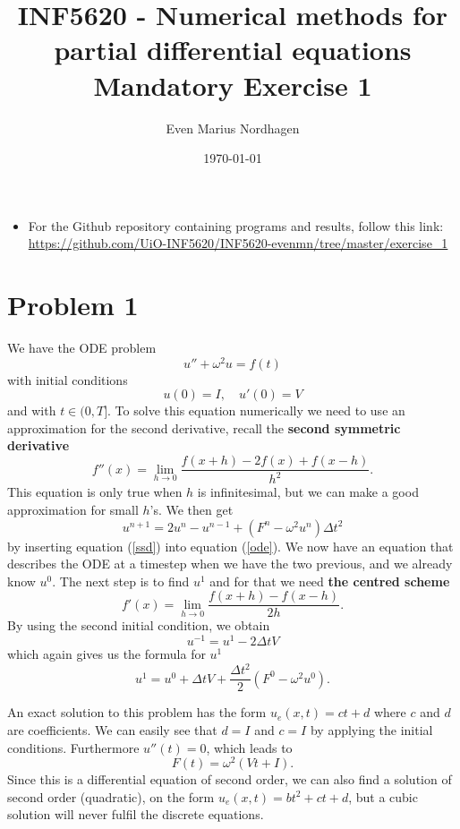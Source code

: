 \documentclass[norsk,a4paper,12pt]{article}
\title{INF5620 - Numerical methods for partial differential equations\\\vspace{2mm} \Large{Mandatory Exercise 1}}
\author{\large Even Marius Nordhagen}
\date\today
\begin{document}
\maketitle

\begin{itemize}
\item For the Github repository containing programs and results, follow this link: 
\url{https://github.com/UiO-INF5620/INF5620-evenmn/tree/master/exercise_1}
\end{itemize}

\section*{Problem 1}
We have the ODE problem
\begin{equation}
u''+\omega^2u=f(t)
\label{ode}
\end{equation}
with initial conditions 
\begin{equation}
u(0)=I,\quad u'(0)=V
\end{equation}
and with $t\in(0,T]$. To solve this equation numerically we need to use an approximation for the second derivative, recall the \textbf{second symmetric derivative}
\begin{equation}
f''(x)=\lim_{h\rightarrow0}\frac{f(x+h)-2f(x)+f(x-h)}{h^2}.
\label{ssd}
\end{equation}
This equation is only true when $h$ is infinitesimal, but we can make a good approximation for small $h$'s. We then get
\begin{equation}
u^{n+1}=2u^n-u^{n-1}+(F^n-\omega^2u^n)\Delta t^2
\end{equation}
by inserting equation (\ref{ssd}) into equation (\ref{ode}). We now have an equation that describes the ODE at a timestep when we have the two previous, and we already know $u^0$. The next step is to find $u^1$ and for that we need \textbf{the centred scheme}
\begin{equation}
f'(x)=\lim_{h\rightarrow0}\frac{f(x+h)-f(x-h)}{2h}.
\end{equation}
By using the second initial condition, we obtain
\begin{equation}
u^{-1}=u^1-2\Delta tV
\end{equation}
which again gives us the formula for $u^1$
\begin{equation}
u^1=u^0+\Delta tV+\frac{\Delta t^2}{2}(F^0-\omega^2u^0).
\end{equation}

An exact solution to this problem has the form $u_e(x,t)=ct+d$ where $c$ and $d$ are coefficients. We can easily see that $d=I$ and $c=I$ by applying the initial conditions. Furthermore $u''(t)=0$, which leads to
\begin{equation}
F(t)=\omega^2(Vt+I).
\end{equation}
Since this is a differential equation of second order, we can also find a solution of second order (quadratic), on the form $u_e(x,t)=bt^2+ct+d$, but a cubic solution will never fulfil the discrete equations. 
\end{document}
